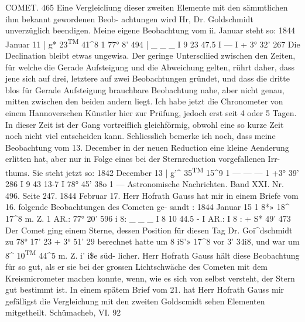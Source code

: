 \documentclass[10pt,a4paper]{article}
\begin{document}
COMET.  465
Eine  Vergleicliung  dieser  zweiten  Elemente  mit  den  sämmtlichen  ihm  bekannt  gewordenen  Beob-
achtungen wird  Hr,  Dr.  Goldschmidt  unverzüglich  beendigen.
Meine  eigene  Beobachtung  vom  ii.  Januar  steht  so:
1844  Januar  11     |     g*\glqq{}  23\textsuperscript{TM}  41\textasciicircum{}8     1     77°  8'  49\glqq{}4     |         \_    \_    \_
I     9     23     47.5     I
---        I     +  3°  32'  26\glqq{}7
Die  Declination  bleibt  etwas  ungewisa.  Der  geringe  Unterscliied  zwischen  den  Zeiten,  für  welche
die  Gerade  Aufsteigung  und  die  Abweichung  gelten,  rührt  daher,  dass  jene  sich  auf  drei,  letztere  auf
zwei  Beobachtungen  gründet,  und  dass  die  dritte  blos  für  Gerade  Aufsteigung  brauchbare  Beobachtung
nahe,  aber  nicht  genau,  mitten  zwischen  den  beiden  andern  liegt.
Ich  habe  jetzt  die  Chronometer  von  einem  Hannoverschen  Künstler  hier  zur  Prüfung,  jedoch  erst
seit  4  oder  5  Tagen.  In  dieser  Zeit  ist  der  Gang  vortreiflich  gleichförmig,  obwohl  eine  so  kurze  Zeit
noch  nicht  viel  entscheiden  kann.
Schliesslich  bemerke  ich  noch,  dass  meine  Beobachtung  vom  13.  December  in  der  neuen  Reduction
eine  kleine  Aenderung  erlitten  hat,  aber  nur  in  Folge  eines  bei  der  Sternreduction  vorgefallenen  Irr-
thums.     Sie  steht  jetzt  so:
1842  December  13     |     g'\textasciicircum{}  35\textsuperscript{TM}  15\textasciicircum{}9     1     ---    ---    ---       1     +3°  39'  28\glqq{}6
I     9     43     13-7     I     78°  45'  38\glqq{}o     1
---
Astronomische  Nachrichten.     Band  XXI.  Nr.  496.  Seite  247.     1844  Februar  17.
Herr  Hofrath  Gauss  hat  mir  in  einem  Briefe  vom  16.  folgende  Beobachtungen  des  Cometen  ge-
sandt :
1844  Januar  15     1     8*»  18\glqq{}\textasciicircum{}  17\textasciicircum{}8  m.  Z.     1     AR.:  77°  20'  59\glqq{}6     i     8:       \_\textbullet{}  \_     \_
I     8     10    44.5     -        I     AR.:          I     8 :  +  S*\glqq{}  49'  47\glqq{}3
Der  Comet  ging  einem  Sterne,  dessen  Position  für  diesen  Tag  Dr.  Goi\textasciicircum{}dschmidt  zu  78°  17'  2\glqq{}3
+  3°  51'  2\glqq{}9  berechnet  hatte  um  8\glqq{}  iS'»  17\textasciicircum{}8  vor  3'  34\glqq{}i8,  und  war  um  8\glqq{}\textasciicircum{}  10\textsuperscript{TM}  44\textasciicircum{}5  m.  Z.  i'  i\$\glqq{}e  süd-
licher. Herr  Hofrath  Gauss  hält  diese  Beobachtung  für  so  gut,  als  er  sie  bei  der  grossen  Lichtschwäche
des  Cometen  mit  dem  Kreismicrometer  machen  konnte,  wenn,  wie  es  sich  von  selbst  versteht,  der
Stern  gut  bestimmt  ist.
In  einem  spätem  Brief  vom  21.  hat  Herr  Hofrath  Gauss  mir  gefälligst  die  Vergleichung  mit  den
zweiten  Goldscmidt sehen  Elementen  mitgetheilt.  Schümacheb,
VI.  92
\end{document}
